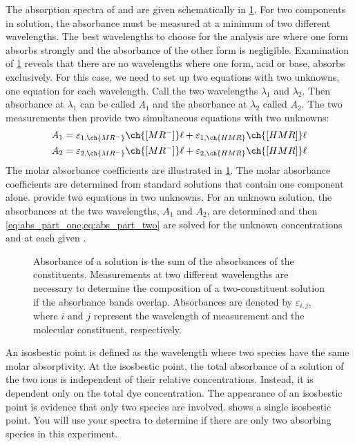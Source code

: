 The absorption spectra of  and  are given schematically in \cref{fig:mixture_absorbance}. 
For two components in solution, the absorbance must be measured at a minimum of two different wavelengths. 
The best wavelengths to choose for the analysis are where one form absorbs strongly and the absorbance of the other form is negligible. 
Examination of \cref{fig:mixture_absorbance} reveals that there are no wavelengths where one form, acid or base, absorbs exclusively. 
For this case, we need to set up two equations with two unknowns, one equation for each wavelength. 
Call the two wavelengths \(\lambda_1\) and \(\lambda_2\). 
Then absorbance at \(\lambda_1\) can be called \(A_1\) and the absorbance at \(\lambda_2\) called \(A_2\). 
The two measurements then provide two simultaneous equations with two unknowns:
\begin{align}
	A_1 &= \varepsilon_{1, \ch{MR^-}} \ch{[MR^-]} \ell + \varepsilon_{1,\ch{HMR}} \ch{[HMR]} \ell 
	\label{eq:abs_part_one} \\
	A_2 &= \varepsilon_{2, \ch{MR^-}} \ch{[MR^-]} \ell + \varepsilon_{2,\ch{HMR}} \ch{[HMR]} \ell 
	\label{eq:abs_part_two}
\end{align}
The molar absorbance coefficients are illustrated in \cref{fig:mixture_absorbance}. 
The molar absorbance coefficients are determined from standard solutions that contain one component alone. 
 provide two equations in two unknowns. 
For an unknown solution, the absorbances at the two wavelengths, \(A_1\) and \(A_2\), are determined and then \cref{eq:abs_part_one,eq:abs_part_two} are solved for the unknown concentrations \ch{[MR^-]} and \ch{[HMR]} at each given \pH. 

\begin{figure}[htb]
	\centering
	
	\caption{Absorbance of a solution is the sum of the absorbances of the constituents. 
	Measurements at two different wavelengths are necessary to determine the composition of a two-constituent solution if the absorbance bands overlap. 
	Absorbances are denoted by \(\varepsilon_{i,j}\), where \(i\) and \(j\) represent the wavelength of measurement and the molecular constituent, respectively.}
	\label{fig:mixture_absorbance}
\end{figure}

An isosbestic point is defined as the wavelength where two species have the same molar absorptivity. 
At the isosbestic point, the total absorbance of a solution of the two ions is independent of their relative concentrations. 
Instead, it is dependent only on the total dye concentration. 
The appearance of an isosbestic point is evidence that only two species are involved. 
 shows a single isosbestic point. 
You will use your spectra to determine if there are only two absorbing species in this experiment. 

